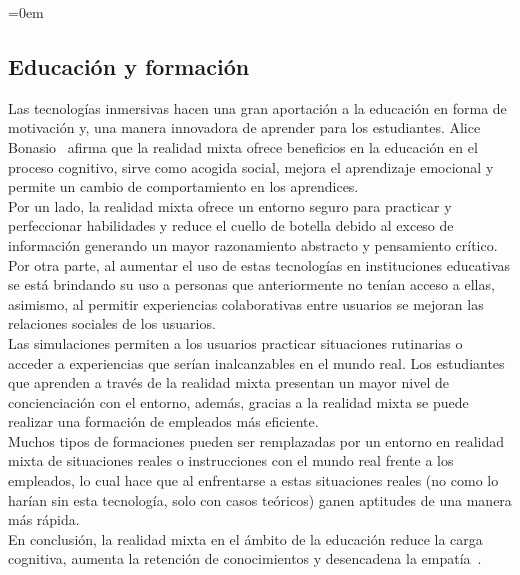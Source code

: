 \parindent=0em
\subsection{Educación y formación}
\noindent

Las tecnologías inmersivas hacen una gran aportación a la educación en forma de motivación y, una manera innovadora de aprender para los estudiantes. Alice Bonasio~\cite{microsoftEducation} afirma que la realidad mixta ofrece beneficios en la educación en el proceso cognitivo, sirve como acogida social, mejora el aprendizaje emocional y permite un cambio de comportamiento en los aprendices.\\ 

Por un lado, la realidad mixta ofrece un entorno seguro para practicar y perfeccionar habilidades y reduce el cuello de botella debido al exceso de información generando un mayor razonamiento abstracto y pensamiento crítico.\\ 

Por otra parte, al aumentar el uso de estas tecnologías en instituciones educativas se está brindando su uso a personas que anteriormente no tenían acceso a ellas, asimismo, al permitir experiencias colaborativas entre usuarios se mejoran las relaciones sociales de los usuarios.\\

Las simulaciones permiten a los usuarios practicar situaciones rutinarias o acceder a experiencias que serían inalcanzables en el mundo real. Los estudiantes que aprenden a través de la realidad mixta presentan un mayor nivel de concienciación con el entorno, además, gracias a la realidad mixta se puede realizar una formación de empleados más eficiente.\\

Muchos tipos de formaciones pueden ser remplazadas por un entorno en realidad mixta de situaciones reales o instrucciones con el mundo real frente a los empleados, lo cual hace que al enfrentarse a estas situaciones reales (no como lo harían sin esta tecnología, solo con casos teóricos) ganen aptitudes de una manera más rápida.\\
 
En conclusión, la realidad mixta en el ámbito de la educación reduce la carga cognitiva, aumenta la retención de conocimientos y desencadena la empatía~\cite{microsoftEducation}.\\



